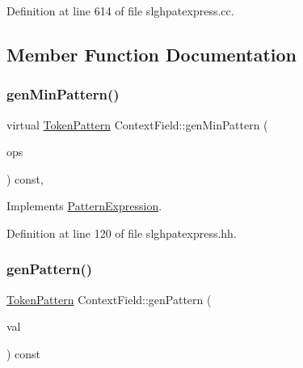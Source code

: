 Definition at line 614 of file slghpatexpress.\+cc.



\subsection{Member Function Documentation}
\mbox{\label{class_context_field_a715c15711f5b53e64694b654060e3257}} 
\subsubsection{\texorpdfstring{genMinPattern()}{genMinPattern()}}
{\footnotesize\ttfamily virtual \mbox{\hyperlink{class_token_pattern}{Token\+Pattern}} Context\+Field\+::gen\+Min\+Pattern (\begin{DoxyParamCaption}\item[{const vector$<$ \mbox{\hyperlink{class_token_pattern}{Token\+Pattern}} $>$ \&}]{ops }\end{DoxyParamCaption}) const\hspace{0.3cm}{\ttfamily [inline]}, {\ttfamily [virtual]}}



Implements \mbox{\hyperlink{class_pattern_expression_a1dc2d0c07f64fdab9da6c0849e992b50}{Pattern\+Expression}}.



Definition at line 120 of file slghpatexpress.\+hh.

\mbox{\label{class_context_field_a678309088b2bad377ad5a5894509988b}} 
\subsubsection{\texorpdfstring{genPattern()}{genPattern()}}
{\footnotesize\ttfamily \mbox{\hyperlink{class_token_pattern}{Token\+Pattern}} Context\+Field\+::gen\+Pattern (\begin{DoxyParamCaption}\item[{\mbox{\hyperlink{types_8h_aa925ba3e627c2df89d5b1cfe84fb8572}{intb}}}]{val }\end{DoxyParamCaption}) const\hspace{0.3cm}{\ttfamily [virtual]}}



